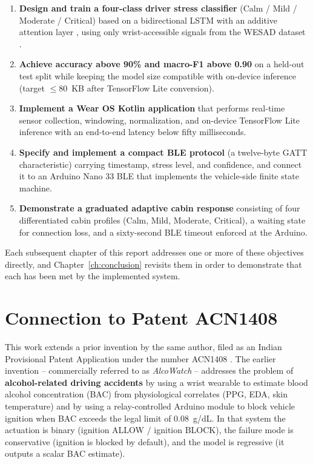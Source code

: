 \begin{enumerate}
  \item \textbf{Design and train a four-class driver stress classifier}
  (Calm / Mild / Moderate / Critical) based on a bidirectional LSTM
  \citep{graves2005bilstm} with an additive attention layer
  \citep{vaswani2017attention}, using only wrist-accessible signals
  from the WESAD dataset \citep{schmidt2018wesad}.

  \item \textbf{Achieve accuracy above 90\% and macro-F1 above 0.90}
  on a held-out test split while keeping the model size compatible
  with on-device inference (target $\le 80$~KB after TensorFlow Lite
  conversion).

  \item \textbf{Implement a Wear OS Kotlin application} that performs
  real-time sensor collection, windowing, normalization, and on-device
  TensorFlow Lite inference \citep{tflite2023} with an end-to-end
  latency below fifty milliseconds.

  \item \textbf{Specify and implement a compact BLE protocol}
  (a twelve-byte GATT characteristic) carrying timestamp, stress level,
  and confidence, and connect it to an Arduino Nano 33 BLE that
  implements the vehicle-side finite state machine.

  \item \textbf{Demonstrate a graduated adaptive cabin response}
  consisting of four differentiated cabin profiles (Calm, Mild,
  Moderate, Critical), a waiting state for connection loss, and a
  sixty-second BLE timeout enforced at the Arduino.
\end{enumerate}

Each subsequent chapter of this report addresses one or more of
these objectives directly, and Chapter~\ref{ch:conclusion} revisits
them in order to demonstrate that each has been met by the
implemented system.

\section{Connection to Patent ACN1408}
\label{sec:acn1408}

This work extends a prior invention by the same author, filed as an
Indian Provisional Patent Application under the number ACN1408
\citep{acn1408}. The earlier invention -- commercially referred to
as \emph{AlcoWatch} -- addresses the problem of \textbf{alcohol-related
driving accidents} by using a wrist wearable to estimate blood alcohol
concentration (BAC) from physiological correlates (PPG, EDA, skin
temperature) and by using a relay-controlled Arduino module to block
vehicle ignition when BAC exceeds the legal limit of 0.08~g/dL. In
that system the actuation is binary (ignition ALLOW / ignition BLOCK),
the failure mode is conservative (ignition is blocked by default),
and the model is regressive (it outputs a scalar BAC estimate).

